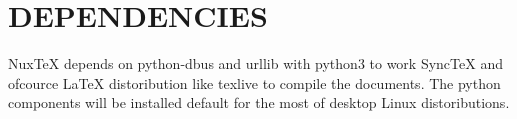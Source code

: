 \section{DEPENDENCIES}

NuxTeX depends on python-dbus and urllib with python3 to work SyncTeX and ofcource LaTeX distoribution like texlive to compile the documents. The python components will be installed default for the most of desktop Linux distoributions.

